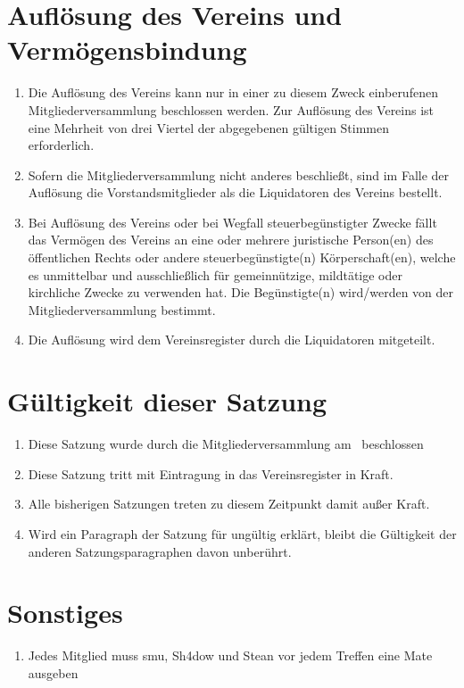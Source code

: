 \documentclass[a4paper,ngerman]{scrartcl}
\begin{document}

\section{Auflösung des Vereins und Vermögensbindung}
\begin{enumerate}
\item Die Auflösung des Vereins kann nur in einer zu diesem Zweck einberufenen Mitgliederversammlung beschlossen werden. Zur Auflösung des Vereins ist eine Mehrheit von drei Viertel der abgegebenen gültigen Stimmen erforderlich.
\item Sofern die Mitgliederversammlung nicht anderes beschließt, sind im Falle der Auflösung die Vorstandsmitglieder als die Liquidatoren des Vereins bestellt.
\item Bei Auflösung des Vereins oder bei Wegfall steuerbegünstigter Zwecke fällt das Vermögen des Vereins an eine oder mehrere juristische Person(en) des öffentlichen Rechts oder andere steuerbegünstigte(n) Körperschaft(en), welche es unmittelbar und ausschließlich für gemeinnützige, mildtätige oder kirchliche Zwecke zu verwenden hat. Die Begünstigte(n) wird/werden von der Mitgliederversammlung bestimmt.
\item Die Auflösung wird dem Vereinsregister durch die Liquidatoren mitgeteilt.
\end{enumerate}

\section{Gültigkeit dieser Satzung}
\begin{enumerate}
\item Diese Satzung wurde durch die Mitgliederversammlung am \MyDate~beschlossen
\item Diese Satzung tritt mit Eintragung in das Vereinsregister in Kraft.
\item Alle bisherigen Satzungen treten zu diesem Zeitpunkt damit außer Kraft.
\item Wird ein Paragraph der Satzung für ungültig erklärt, bleibt die Gültigkeit der anderen Satzungsparagraphen davon unberührt.
\end{enumerate}

\section{Sonstiges}
\begin{enumerate}
\item Jedes Mitglied muss smu, Sh4dow und Stean vor jedem Treffen eine Mate ausgeben
\end{enumerate}
\end{document}
